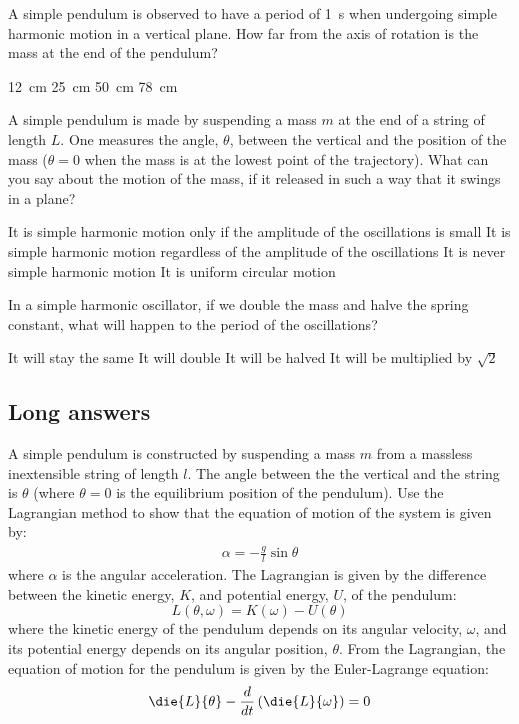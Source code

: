 \question A simple pendulum is observed to have a period of \SI{1}{s} when undergoing simple harmonic motion in a vertical plane. How far from the axis of rotation is the mass at the end of the pendulum? 
\begin{choices} 
\choice \SI{12}{cm}
\CorrectChoice \SI{25}{cm} \correct
\choice \SI{50}{cm}
\choice \SI{78}{cm}
\end{choices}

\question A simple pendulum is made by suspending a mass $m$ at the end of a string of length $L$. One measures the angle, $\theta$, between the vertical and the position of the mass ($\theta=0$ when the mass is at the lowest point of the trajectory). What can you say about the motion of the mass, if it released in such a way that it swings in a plane?
\begin{checkboxes} 
\CorrectChoice It is simple harmonic motion only if the amplitude of the oscillations is small \correct
\choice It is simple harmonic motion regardless of the amplitude of the oscillations
\choice It is never simple harmonic motion 
\choice It is uniform circular motion
\end{checkboxes}

\question In a simple harmonic oscillator, if we double the mass and halve the spring constant, what will happen to the period of the oscillations?
\begin{checkboxes}
\choice It will stay the same
\CorrectChoice It will double \correct
\choice It will be halved
\choice It will be multiplied by $\sqrt{2}$
\end{checkboxes}

%
%
\subsection{Long answers}
\question A simple pendulum is constructed by suspending a mass $m$ from a massless inextensible string of length $l$. The angle between the the vertical and the string is $\theta$ (where $\theta=0$ is the equilibrium position of the pendulum). Use the Lagrangian method to show that the equation of motion of the system is given by:
\begin{align*}
\alpha = - \frac{g}{l} \sin \theta
\end{align*}
where $\alpha$ is the angular acceleration. The Lagrangian is given by the difference between the kinetic energy, $K$, and potential energy, $U$, of the pendulum:
\begin{equation}
L(\theta, \omega) = K(\omega) - U(\theta)
\end{equation}
where the kinetic energy of the pendulum depends on its angular velocity, $\omega$, and its potential energy depends on its angular position, $\theta$. From the Lagrangian, the equation of motion for the pendulum is given by the Euler-Lagrange equation:
\begin{equation}
\die{L}{\theta} - \frac{d}{dt} \left(\die{L}{\omega} \right)= 0
\end{equation}

